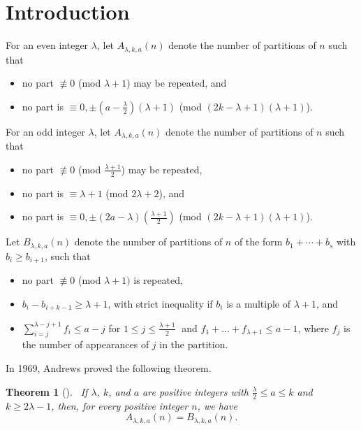 \documentclass[12pt,twoside]{amsart}
\newtheorem{Theorem}{Theorem}
\theoremstyle{remark}
\numberwithin{equation}{section}
\begin{document}
\section{Introduction} \label{sec:1}


For an even integer $\lambda$, let
$A_{\lambda ,k,a}(n)$ denote the number of partitions of  $n$
such that

\begin{itemize}
\item  no part $\not\equiv 0$ (mod $\lambda+1$) may
be repeated, and
\item  no part is $\equiv0,\pm \left(a -
\frac{\lambda}{2}\right)(\lambda +1)$ (mod
$(2k-\lambda+1)(\lambda+1)$).
\end{itemize}



For an odd integer $\lambda$, let $A_{\lambda ,k,a}(n)$ denote
the number of partitions of $n$ such that

\begin{itemize}
\item no part  $ \not \equiv 0$ \big(mod
$\frac{\lambda+1}{2}$\big) may be repeated,
\item no part is $\equiv
\lambda +1$ (mod $2\lambda +2$), and
\item  no part is $\equiv
0,\pm(2a-\lambda)\left(\frac{\lambda +1}{2}\right)$ (mod
$(2k-\lambda+1)(\lambda+1)$).
\end{itemize}

\medskip
Let $B_{\lambda ,k,a}(n)$
denote the number of partitions of $n$ of the form $b_1 + \cdots
+ b_{s}$ with $b_{i} \geq b_{i+1}$, such that

\begin{itemize}
\item no part $\not \equiv 0$ (mod
$\lambda+1)$ is repeated,
\item $b_{i} - b_{i+k-1} \geq \lambda+1$,
with strict inequality if $b_i$ is a multiple of $\lambda+1$, and
\item $\sum_{i=j}^{\lambda-j+1}f_{i} \leq a-j$ for $1 \leq j \leq
\frac{\lambda+1}{2}\;$ and $f_1+\dots+f_{\lambda+1} \leq a-1$, where
$f_{j}$ is the number of appearances of $j$ in the
partition.
\end{itemize}

\medskip
In 1969, Andrews \cite{R1} proved the following theorem.


\begin{Theorem}[{\protect\cite[Th.~2]{R1}}] \label{thm:1}
 \ If $\lambda$, $k $, and $a$ are
 positive integers with $  \frac{\lambda}{2} \leq a
\leq k$ and $ k \geq 2\lambda - 1  $, then, for every positive
integer $n$, we have $$A_{\lambda ,k,a}(n)=B_{\lambda ,k,a}(n).$$
\end{Theorem}
\end{document}
